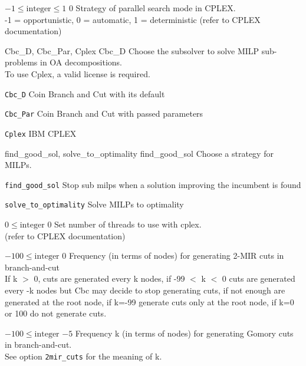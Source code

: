 %
{$-1\leq\textrm{integer}\leq1$}%
{$0$}%
{Strategy of parallel search mode in CPLEX.\\
-1 = opportunistic, 0 = automatic, 1 = deterministic (refer to CPLEX documentation)}%
{}

%
{Cbc\_D, Cbc\_Par, Cplex}%
{Cbc\_D}%
{Choose the subsolver to solve MILP sub-problems in OA decompositions.\\
 To use Cplex, a valid license is required.}%
{\begin{list}{}{
\setlength{\parsep}{0em}
\setlength{\leftmargin}{5ex}
\setlength{\labelwidth}{2ex}
\setlength{\itemindent}{0ex}
\setlength{\topsep}{0pt}}
\item[\texttt{Cbc\_D}] Coin Branch and Cut with its default
\item[\texttt{Cbc\_Par}] Coin Branch and Cut with passed parameters
\item[\texttt{Cplex}] IBM CPLEX
\end{list}
}

%
{\ttfamily find\_good\_sol, solve\_to\_optimality}%
{find\_good\_sol}%
{Choose a strategy for MILPs.}%
{\begin{list}{}{
\setlength{\parsep}{0em}
\setlength{\leftmargin}{5ex}
\setlength{\labelwidth}{2ex}
\setlength{\itemindent}{0ex}
\setlength{\topsep}{0pt}}
\item[\texttt{find\_good\_sol}] Stop sub milps when a solution improving the incumbent is found
\item[\texttt{solve\_to\_optimality}] Solve MILPs to optimality
\end{list}
}

%
{$0\leq\textrm{integer}$}%
{$0$}%
{Set number of threads to use with cplex.\\
(refer to CPLEX documentation)}%
{}

%
{$-100\leq\textrm{integer}$}%
{$0$}%
{Frequency (in terms of nodes) for generating 2-MIR cuts in branch-and-cut\\
If k $>$ 0, cuts are generated every k nodes, if -99 $<$ k $<$ 0 cuts are generated every -k nodes but Cbc may decide to stop generating cuts, if not enough are generated at the root node, if k=-99 generate cuts only at the root node, if k=0 or 100 do not generate cuts.}%
{}

%
{$-100\leq\textrm{integer}$}%
{$-5$}%
{Frequency k (in terms of nodes) for generating Gomory cuts in branch-and-cut.\\
See option \texttt{2mir\_cuts} for the meaning of k.}%
{}

